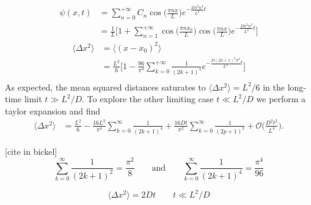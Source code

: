 \begin{align*}
  \psi(x,t) &= \sum_{n=0}^{+\infty} C_n \cos\Big(\frac{\pi n x}{L}\Big) e^{- \frac{D\pi^2
  n^2}{L^2}t}\\
            &=\frac{1}{L} \Bigg[ 1 + \sum_{n=1}^{+\infty} \cos\Big(\frac{\pi n
  x_0}{L}\Big) \cos\Big(\frac{\pi n x}{L}\Big) e^{- \frac{D\pi^2  n^2}{L^2}t}\Bigg]
\end{align*}
\begin{align*}
  \langle \Delta x^2 \rangle &= \langle(x-x_0)^2\rangle\\&= \frac{L^2}{6}\Bigg[1 -
  \frac{96}{\pi^4}
  \sum_{k=0}^{+\infty} \frac{1}{(2k+1)^4} e^{- \frac{D(2k+1)^2 \pi^2}{L^2}t}\Bigg]\\
\end{align*}
As expected, the mean squared distances saturates to $\langle \Delta x^2 \rangle = L^2/6$
in the long-time limit $t \gg L^2 / D.$ To explore the other limiting case $t \ll L^2/D
$ we perform a taylor expansion and find
\begin{align*}
  \langle \Delta x^2 \rangle &= \frac{L^2}{6} - \frac{16 L^2}{\pi^4} \sum_{k=0}^{\infty}
  \frac{1}{(2k+1)^4} + \frac{16 D t}{\pi^2} \sum_{k=0}^{\infty} \frac{1}{(2p+1)^2} +
  \mathcal{O}\bigg(\frac{D^2 t^2}{L^4}\bigg).
\end{align*}

[cite in bickel]
\begin{equation*}
  \sum_{k=0}^{\infty} \frac{1}{(2k+1)^2} = \frac{\pi^2}{8} \qquad \text{and} \qquad
  \sum_{k=0}^{\infty} \frac{1}{(2k+1)^4} = \frac{\pi^4}{96}
\end{equation*}

\begin{equation*}
\langle \Delta x^2 \rangle = 2Dt \qquad t \ll L^2/D
\end{equation*}
